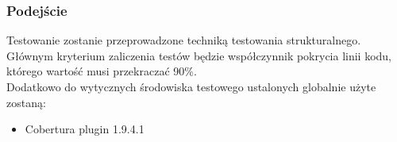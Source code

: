 \subsubsection{Podejście}
Testowanie zostanie przeprowadzone techniką testowania strukturalnego. Głównym
kryterium zaliczenia testów będzie współczynnik pokrycia linii kodu, którego wartość
musi przekraczać 90\%.\\

\noindent
Dodatkowo do wytycznych środowiska testowego ustalonych globalnie użyte zostaną:
\begin{itemize}[nosep]
    \item Cobertura plugin 1.9.4.1
\end{itemize}

